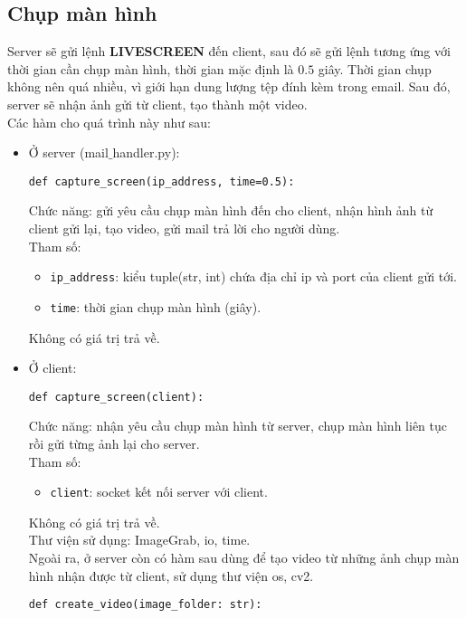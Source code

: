 \subsection{Chụp màn hình}
Server sẽ gửi lệnh \textbf{LIVESCREEN} đến client, sau đó sẽ gửi lệnh tương ứng với thời gian cần chụp màn hình, thời gian mặc định là $0.5$ giây. Thời gian chụp không nên quá nhiều, vì giới hạn dung lượng tệp đính kèm trong email. Sau đó, server sẽ nhận ảnh gửi từ client, tạo thành một video.\\
Các hàm cho quá trình này như sau:
\begin{itemize}
\item Ở server (mail$\_$handler.py):
\begin{lstlisting}
def capture_screen(ip_address, time=0.5):
\end{lstlisting}
Chức năng: gửi yêu cầu chụp màn hình đến cho client, nhận hình ảnh từ client gửi lại, tạo video, gửi mail trả lời cho người dùng.\\
Tham số: 
\begin{itemize}
\item \lstinline{ip_address}: kiểu tuple(str, int) chứa địa chỉ ip và port của client gửi tới.
\item \lstinline{time}: thời gian chụp màn hình (giây).
\end{itemize}
Không có giá trị trả về. 
\item Ở client:
\begin{lstlisting}
def capture_screen(client):
\end{lstlisting}
Chức năng: nhận yêu cầu chụp màn hình từ server, chụp màn hình liên tục rồi gửi từng ảnh lại cho server.\\
Tham số: 
\begin{itemize}
\item \lstinline{client}: socket kết nối server với client.
\end{itemize}
Không có giá trị trả về.\\
Thư viện sử dụng: ImageGrab, io, time.\\
Ngoài ra, ở server còn có hàm sau dùng để tạo video từ những ảnh chụp màn hình nhận được từ client, sử dụng thư viện os, cv2.
\begin{lstlisting}
def create_video(image_folder: str):
\end{lstlisting}

\end{itemize}


